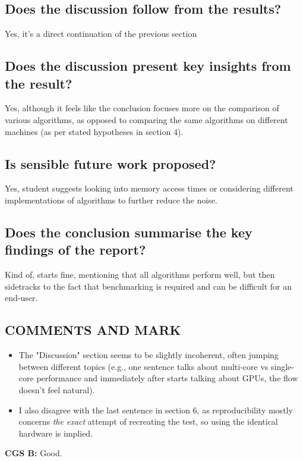 \documentclass{article}
\begin{document}
\begin{normalsize}
\subsection{Does the discussion follow from the results?}
Yes, it's a direct continuation of the previous section
\subsection{Does the discussion present key insights from the result?}
Yes, although it feels like the conclusion focuses more on the comparison of various algorithms, as opposed to comparing the same algorithms on different machines (as per stated hypotheses in section 4).
\subsection{Is sensible future work proposed?}
Yes, student suggests looking into memory access times or considering different implementations of algorithms to further reduce the noise. 
\subsection{Does the conclusion summarise the key findings of the report?}
Kind of, starts fine, mentioning that all algorithms perform well, but then sidetracks to the fact that benchmarking is required and can be difficult for an end-user. 
\subsection{COMMENTS AND MARK}
\begin{itemize}
  \item The "Discussion" section seems to be slightly incoherent, often jumping between different topics (e.g., one sentence talks about multi-core vs single-core performance and immediately after starts talking about GPUs, the flow doesn't feel natural).
  \item I also disagree with the last sentence in section 6, as reproducibility mostly concerns \textit{the exact} attempt of recreating the test, so using the identical hardware is implied.
\end{itemize}
\textbf{CGS B: } Good.

\end{normalsize}
\end{document}
